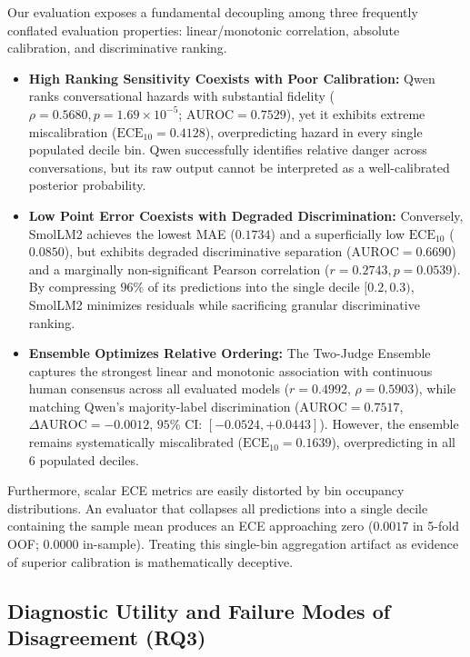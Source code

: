 Our evaluation exposes a fundamental decoupling among three frequently conflated evaluation properties: linear/monotonic correlation, absolute calibration, and discriminative ranking.
\begin{itemize}
    \item \textbf{High Ranking Sensitivity Coexists with Poor Calibration:} Qwen ranks conversational hazards with substantial fidelity ($\rho=0.5680, p=1.69\times 10^{-5}$; $\text{AUROC}=0.7529$), yet it exhibits extreme miscalibration ($\text{ECE}_{10}=0.4128$), overpredicting hazard in every single populated decile bin. Qwen successfully identifies relative danger across conversations, but its raw output cannot be interpreted as a well-calibrated posterior probability.
    \item \textbf{Low Point Error Coexists with Degraded Discrimination:} Conversely, SmolLM2 achieves the lowest MAE ($0.1734$) and a superficially low $\text{ECE}_{10}$ ($0.0850$), but exhibits degraded discriminative separation ($\text{AUROC}=0.6690$) and a marginally non-significant Pearson correlation ($r=0.2743, p=0.0539$). By compressing $96\%$ of its predictions into the single decile $[0.2, 0.3)$, SmolLM2 minimizes residuals while sacrificing granular discriminative ranking.
    \item \textbf{Ensemble Optimizes Relative Ordering:} The Two-Judge Ensemble captures the strongest linear and monotonic association with continuous human consensus across all evaluated models ($r=\mathbf{0.4992}$, $\rho=\mathbf{0.5903}$), while matching Qwen's majority-label discrimination ($\text{AUROC}=0.7517$, $\Delta\text{AUROC}=-0.0012$, $95\%$ CI: $[-0.0524, +0.0443]$). However, the ensemble remains systematically miscalibrated ($\text{ECE}_{10}=0.1639$), overpredicting in all 6 populated deciles.
\end{itemize}

Furthermore, scalar ECE metrics are easily distorted by bin occupancy distributions. An evaluator that collapses all predictions into a single decile containing the sample mean produces an ECE approaching zero ($0.0017$ in 5-fold OOF; $0.0000$ in-sample). Treating this single-bin aggregation artifact as evidence of superior calibration is mathematically deceptive.

\subsection{Diagnostic Utility and Failure Modes of Disagreement (RQ3)}
\label{subsec:disc_disagreement_implications}


